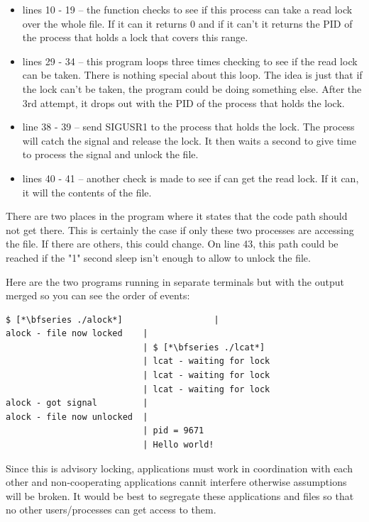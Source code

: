 \begin{itemize}
	\item lines 10 - 19 -- the  function checks to see if this process can take a read lock over
		the whole file. If it can it returns 0 and if it can't it returns the PID of the process that holds a lock that covers
		this range.
	\item lines 29 - 34 --  this program loops three times checking to see if the read lock can be taken. There is 
		nothing special about this loop. The idea is just that if the lock can't be taken, the program could be doing
		something else. After the 3rd attempt, it drops out with the PID of the process that holds the lock.
	\item line 38 - 39 -- send SIGUSR1 to the process that holds the lock. The  process will catch the signal
		and release the lock. It then waits a second to give  time to process the signal and unlock the file.
	\item lines 40 - 41 -- another check is made to see if  can get the read lock. If it can, it will 
		the contents of the file.
\end{itemize}

\noindent
There are two places in the program where it states that the code path should not get there. This is certainly the case if only these two processes are accessing the file. If there are others, this could change. On line 43, this path could be reached if the "1" second sleep isn't enough to allow  to unlock the file.

Here are the two programs running in separate terminals but with the output merged so you can see the order of events:

\begin{lstlisting}
$ [*\bfseries ./alock*]                  |   
alock - file now locked    | 
                           | $ [*\bfseries ./lcat*]
                           | lcat - waiting for lock 
                           | lcat - waiting for lock 
                           | lcat - waiting for lock 
alock - got signal         | 
alock - file now unlocked  | 
                           | pid = 9671
                           | Hello world!
\end{lstlisting}

\noindent
Since this is advisory locking, applications must work in coordination with each other and non-cooperating applications cannit interfere otherwise assumptions will be broken. It would be best to segregate these applications and files so that no other users/processes can get access to them.

